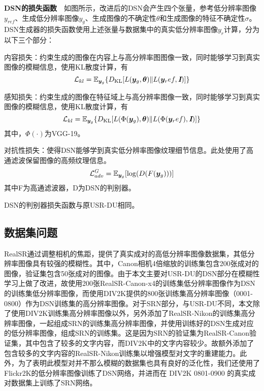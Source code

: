 \noindent\textbf{DSN的损失函数}\ \ 如图所示，改进后的DSN会产生四个张量，参考低分辨率图像$y_{ref}$、生成低分辨率图像$y_g$、生成图像的不确定性$\theta$和生成图像的特征不确定性$\sigma$。DSN生成器的损失函数使用上述张量与数据集中的真实低分辨率图像$y_r$计算，分为以下三个部分：

内容损失：约束生成的图像在内容上与高分辨率图图像一致，同时能够学习到真实图像的模糊信息，使用KL散度计算，有
\begin{equation}
    \mathcal{L}_{kl}=\mathbb{E}_{\vb*{y}_g}\{D_{\text{KL}}[L(\vb*{y}_g,\bm{\theta})\|L(\vb*{y}_ref,\textbf{\em I})]\}
\end{equation}

感知损失：约束生成的图像在特征域上与高分辨率图像一致，同时能够学习到真实图像的模糊信息，使用KL散度计算，有
\begin{equation}
    \mathcal{L}_{kl}=\mathbb{E}_{\vb*{y}_g}\{D_{\text{KL}}[L(\Phi(\vb*{y}_g),\bm{\theta})\|L(\Phi(\vb*{y}_ref),\textbf{\em I})]\}
\end{equation}
其中，$\Phi(\cdot)$为VGG-19。

对抗性损失：使得DSN能够学到真实低分辨率图像纹理细节信息。此处使用了高通滤波保留图像的高频纹理信息。
\begin{equation}
    \mathcal{L}_{adv}^G=\mathbb{E}_{\vb*{y}_g}[\log(D(F(\vb*{y}_g)))]
\end{equation}
其中F为高通滤波器，D为DSN的判别器。

DSN的判别器损失函数与原USR-DU相同。

\subsection{数据集问题}
RealSR通过调整相机的焦距，提供了真实成对的高低分辨率图像数据集，其低分辨率图像具有较强的模糊性。其中，Canon相机4倍缩放的训练集包含200张成对的图像，验证集包含50张成对的图像。由于本文主要对USR-DU的DSN部分在模糊性学习上做了改进，故使用200张RealSR-Canon-x4的训练集低分辨率图像作为DSN的训练集低分辨率图像，而使用DIV2K提供的800张训练集高分辨率图像（0001-0800）作为DSN训练集的高分辨率图像。对于SRN部分，与USR-DU不同，本文除了使用DIV2K训练集高分辨率图像以外，另外添加了RealSR-Nikon的训练集高分辨率图像，一起组成SRN的训练集高分辨率图像，并使用训练好的DSN生成对应的低分辨率图像，组成SRN的训练集。这是因为SRN的验证集为RealSR-Canon验证集，其中包含了较多的文字内容，而DIV2K中的文字内容较少。故额外添加了包含较多的文字内容的RealSR-Nikon训练集以增强模型对文字的重建能力。此外，为了表明此模型对并不那么模糊的数据集也具有良好的泛化性，我们还使用了Flickr2K的低分辨率图像训练了DSN网络，并进而在 DIV2K 0801-0900 的真实成对数据集上训练了SRN网络。
